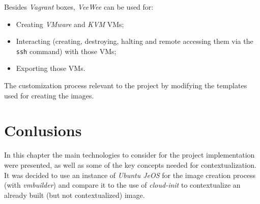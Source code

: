 Besides \textit{Vagrant} boxes, \textit{VeeWee} can be used for:

\begin{itemize}
\item Creating \textit{VMware} and \textit{KVM} VMs;
\item Interacting (creating, destroying, halting and remote accessing them via the \texttt{ssh} command) with those VMs;
\item Exporting those VMs.
\end{itemize}

The customization process relevant to the project by modifying the templates used for creating the images.

\section{Conlusions}\label{sota:concl}

In this chapter the main technologies to consider for the project implementation were presented, as well as some of the key concepts needed for contextualization.
It was decided to use an instance of \textit{Ubuntu JeOS} for the image creation process (with \textit{vmbuilder}) and compare it to the use of \textit{cloud-init} to contextualize an already built (but not contextualized) image.

